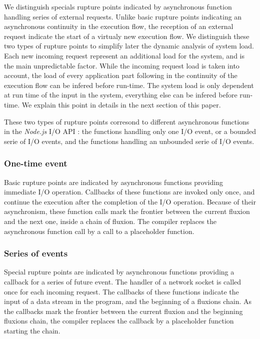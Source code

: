 We distinguish specials rupture points indicated by asynchronous function handling series of external requests.
Unlike basic rupture points indicating an asynchronous continuity in the execution flow, the reception of an external request indicate the start of a virtualy new execution flow.
We distinguish these two types of rupture points to simplify later the dynamic analysis of system load.
Each new incoming request represent an additional load for the system, and is the main unpredictable factor.
While the incoming request load is taken into account, the load of every application part following in the continuity of the execution flow can be infered before run-time. 
The system load is only dependent at run time of the input in the system, everything else can be infered before run-time.
We explain this point in details in the next section of this paper.

These two types of rupture points corresond to different asynchronous functions in the \textit{Node.js} I/O API : the functions handling only one I/O event, or a bounded serie of I/O events, and the functions handling an unbounded serie of I/O events.

\subsubsection{One-time event} \label{sss:post}

Basic rupture points are indicated by asynchronous functions providing immediate I/O operation.
Callbacks of these functions are invoked only once, and continue the execution after the completion of the I/O operation.
Because of their asynchronism, these function calls mark the frontier between the current fluxion and the next one, inside a chain of fluxion.
The compiler replaces the asynchronous function call by a call to a placeholder function.

\subsubsection{Series of events} \label{sss:start}

Special rupture points are indicated by asynchronous functions providing a callback for a series of future event.
The handler of a network socket is called once for each incoming request.
The callbacks of these functions indicate the input of a data stream in the program, and the beginning of a fluxions chain.
As the callbacks mark the frontier between the current fluxion and the beginning fluxions chain, the compiler replaces the callback by a placeholder function starting the chain.

